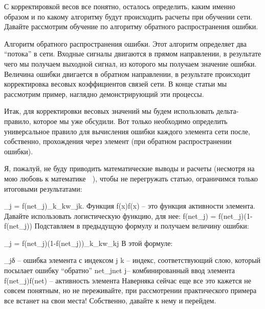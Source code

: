 \documentclass[12pt,a4paper]{report}
\begin{document}
С корректировкой весов все понятно, осталось определить, каким именно образом и по какому алгоритму будут происходить расчеты при обучении сети. Давайте рассмотрим обучение по алгоритму обратного распространения ошибки.

Алгоритм обратного распространения ошибки.
Этот алгоритм определяет два “потока” в сети. Входные сигналы двигаются в прямом направлении, в результате чего мы получаем выходной сигнал, из которого мы получаем значение ошибки. Величина ошибки двигается в обратном направлении, в результате происходит корректировка весовых коэффициентов связей сети. В конце статьи мы рассмотрим пример, наглядно демонстрирующий эти процессы.

Итак, для корректировки весовых значений мы будем использовать дельта-правило, которое мы уже обсудили. Вот только необходимо определить универсальное правило для вычисления ошибки каждого элемента сети после, собственно, прохождения через элемент (при обратном распространении ошибки).

Я, пожалуй, не буду приводить математические выводы и расчеты (несмотря на мою любовь к математике 🙂 ), чтобы не перегружать статью, ограничимся только итоговыми результатами:

\delta_j = f{\Large{\prime}}(net_j)\medspace\cdot\medspace \sum_{k}{}{\delta_k\medspace w_{jk}}. Функция f(x)f(x) – это функция активности элемента. Давайте использовать логистическую функцию, для нее:
f{\Large{\prime}}(net_j) = f(net_j)\medspace (1\medspace-\medspace f(net_j))
Подставляем в предыдущую формулу и получаем величину ошибки:

\delta_j = f(net_j)\medspace (1\medspace-\medspace f(net_j))\medspace \sum_{k}{}{\delta_k\medspace w_{kj}}
В этой формуле:

\delta_jδ  – ошибка элемента с индексом j
k – индекс, соответствующий слою, который посылает ошибку “обратно”
net_jnet 
j– комбинированный ввод элемента
f(net_j)f(net) – активность элемента
Наверняка сейчас еще все это кажется не совсем понятным, но не переживайте, при рассмотрении практического примера все встанет на свои места! Собственно, давайте к нему и перейдем.
\end{document}
